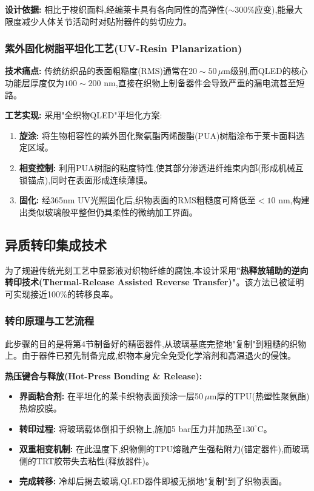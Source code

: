 \documentclass[12pt,a4paper]{article}
\begin{document}
\textbf{设计依据:} 相比于梭织面料,经编莱卡具有各向同性的高弹性($\sim$300\%应变),能最大限度减少人体关节活动时对贴附器件的剪切应力。

\subsubsection{紫外固化树脂平坦化工艺(UV-Resin Planarization)}

\textbf{技术痛点:} 传统纺织品的表面粗糙度(RMS)通常在$20 \sim 50\,\mu$m级别,而QLED的核心功能层厚度仅为$100 \sim 200$ nm,直接在织物上制备器件会导致严重的漏电流甚至短路。

\textbf{工艺实现:} 采用"全织物QLED"平坦化方案:

\begin{enumerate}
    \item \textbf{旋涂:} 将生物相容性的紫外固化聚氨酯丙烯酸酯(PUA)树脂涂布于莱卡面料选定区域。
    
    \item \textbf{相变控制:} 利用PUA树脂的粘度特性,使其部分渗透进纤维束内部(形成机械互锁锚点),同时在表面形成连续薄膜。
    
    \item \textbf{固化:} 经365nm UV光照固化后,织物表面的RMS粗糙度可降低至$< 10$ nm,构建出类似玻璃般平整但仍具柔性的微纳加工界面。
\end{enumerate}

\subsection{异质转印集成技术}

为了规避传统光刻工艺中显影液对织物纤维的腐蚀,本设计采用\textbf{"热释放辅助的逆向转印技术(Thermal-Release Assisted Reverse Transfer)"}。该方法已被证明可实现接近100\%的转移良率\cite{kim2024recent}。

\subsubsection{转印原理与工艺流程}

此步骤的目的是将第4节制备好的精密器件,从玻璃基底完整地"复制"到粗糙的织物上。由于器件已预先制备完成,织物本身完全免受化学溶剂和高温退火的侵蚀。

\textbf{热压键合与释放(Hot-Press Bonding \& Release):}

\begin{itemize}
    \item \textbf{界面粘合剂:} 在平坦化的莱卡织物表面预涂一层50$\,\mu$m厚的TPU(热塑性聚氨酯)热熔胶膜。
    
    \item \textbf{转印过程:} 将玻璃载体倒扣于织物上,施加5 bar压力并加热至$130^{\circ}$C。
    
    \item \textbf{双重相变机制:} 在此温度下,织物侧的TPU熔融产生强粘附力(锚定器件),而玻璃侧的TRT胶带失去粘性(释放器件)。
    
    \item \textbf{完成转移:} 冷却后揭去玻璃,QLED器件即被无损地"复制"到了织物表面。
\end{itemize}
\end{document}
